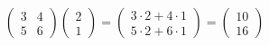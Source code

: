 \documentclass[preview]{standalone}
\begin{document}
\begin{align*}
\begin{pmatrix}3 & 4 \\ 5 & 6\end{pmatrix} \begin{pmatrix}2 \\ 1\end{pmatrix} = \begin{pmatrix}3 \cdot 2 + 4 \cdot 1\\5 \cdot 2 + 6 \cdot 1\end{pmatrix} = \begin{pmatrix}10\\16\end{pmatrix}
\end{align*}
\end{document}
